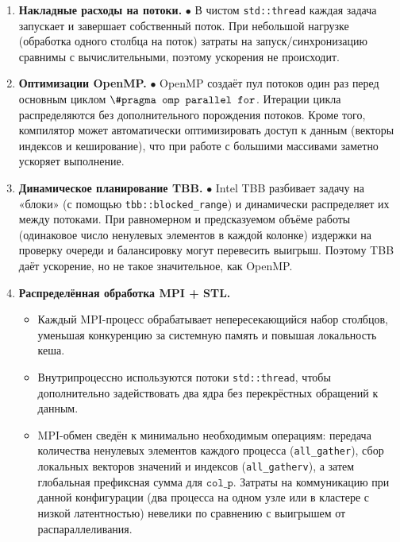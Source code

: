 \documentclass[12pt]{article}
\begin{document}
\begin{enumerate}
  \item \textbf{Накладные расходы на потоки.}  
    \(\bullet\) В чистом \texttt{std::thread} каждая задача запускает и завершает собственный поток. При небольшой нагрузке (обработка одного столбца на поток) затраты на запуск/синхронизацию сравнимы с вычислительными, поэтому ускорения не происходит.

  \item \textbf{Оптимизации OpenMP.}  
    \(\bullet\) OpenMP создаёт пул потоков один раз перед основным циклом \(\verb|\#pragma omp parallel for|\). Итерации цикла распределяются без дополнительного порождения потоков. Кроме того, компилятор может автоматически оптимизировать доступ к данным (векторы индексов и кеширование), что при работе с большими массивами заметно ускоряет выполнение.

  \item \textbf{Динамическое планирование TBB.}  
    \(\bullet\) Intel TBB разбивает задачу на «блоки» (с помощью \texttt{tbb::blocked\_range}) и динамически распределяет их между потоками. При равномерном и предсказуемом объёме работы (одинаковое число ненулевых элементов в каждой колонке) издержки на проверку очереди и балансировку могут перевесить выигрыш. Поэтому TBB даёт ускорение, но не такое значительное, как OpenMP.

  \item \textbf{Распределённая обработка MPI + STL.}  
    \begin{itemize}
      \item Каждый MPI-процесс обрабатывает непересекающийся набор столбцов, уменьшая конкуренцию за системную память и повышая локальность кеша.  
      \item Внутрипроцессно используются потоки \texttt{std::thread}, чтобы дополнительно задействовать два ядра без перекрёстных обращений к данным.  
      \item MPI-обмен сведён к минимально необходимым операциям: передача количества ненулевых элементов каждого процесса (\texttt{all\_gather}), сбор локальных векторов значений и индексов (\texttt{all\_gatherv}), а затем глобальная префиксная сумма для \(\texttt{col\_p}\). Затраты на коммуникацию при данной конфигурации (два процесса на одном узле или в кластере с низкой латентностью) невелики по сравнению с выигрышем от распараллеливания.
    \end{itemize}
\end{enumerate}
\end{document}
